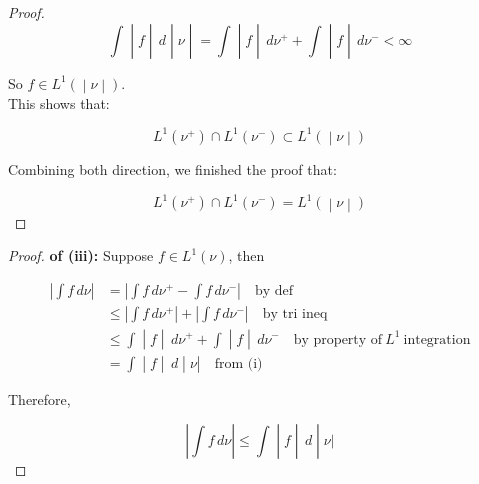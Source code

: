 \begin{proof}
\[\left. \int \middle| f \middle| \, d \middle| \nu \middle| = \int \middle| f \middle| \, d\nu^{+} + \int \middle| f \middle| \, d\nu^{-} < \infty \right.\]

So \(\left. f \in L^{1}( \middle| \nu \middle| ) \right.\).\\
This shows that:

\[\left. L^{1}(\nu^{+}) \cap L^{1}(\nu^{-}) \subset L^{1}( \middle| \nu \middle| ) \right.\]

Combining both direction, we finished the proof that:

\[\left. L^{1}(\nu^{+}) \cap L^{1}(\nu^{-}) = L^{1}( \middle| \nu \middle| ) \right.\]

\end{proof}

\begin{proof}

\textbf{of (iii):} Suppose \(f \in L^{1}(\nu)\), then

\[\begin{matrix}
\left| {\int f\, d\nu} \right| & {= \left| {\int f\, d\nu^{+} - \int f\, d\nu^{-}} \right|\quad\text{by def}} \\
 & {\leq \left| {\int f\, d\nu^{+}} \right| + \left| {\int f\, d\nu^{-}} \right|\quad\text{by tri ineq}} \\
 & \left. \leq \int \middle| f \middle| \, d\nu^{+} + \int \middle| f \middle| \, d\nu^{-}\quad\text{by property of}\ L^{1}\ \text{integration} \right. \\
 & {\left. = \int \middle| f \middle| \, d \middle| \nu \right|\quad\text{from (i)}}
\end{matrix}\]

Therefore,

\[\left. \left| {\int f\, d\nu} \right| \leq \int \middle| f \middle| \, d \middle| \nu| \right.\]

\end{proof}

